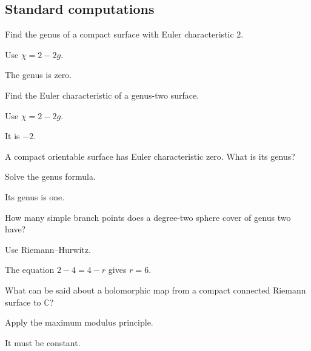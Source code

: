 \subsection*{Standard computations}

\begin{exercise}\label{exr:iv26-expand-01}
Find the genus of a compact surface with Euler characteristic \(2\).
\end{exercise}
\begin{hint}
Use \(\chi=2-2g\).
\end{hint}
\begin{solution}
The genus is zero.
\end{solution}

\begin{exercise}\label{exr:iv26-expand-02}
Find the Euler characteristic of a genus-two surface.
\end{exercise}
\begin{hint}
Use \(\chi=2-2g\).
\end{hint}
\begin{solution}
It is \(-2\).
\end{solution}

\begin{exercise}\label{exr:iv26-expand-03}
A compact orientable surface has Euler characteristic zero. What is its genus?
\end{exercise}
\begin{hint}
Solve the genus formula.
\end{hint}
\begin{solution}
Its genus is one.
\end{solution}

\begin{exercise}\label{exr:iv26-expand-04}
How many simple branch points does a degree-two sphere cover of genus two have?
\end{exercise}
\begin{hint}
Use Riemann--Hurwitz.
\end{hint}
\begin{solution}
The equation \(2-4=4-r\) gives \(r=6\).
\end{solution}

\begin{exercise}\label{exr:iv26-expand-05}
What can be said about a holomorphic map from a compact connected Riemann surface to \(\mathbb C\)?
\end{exercise}
\begin{hint}
Apply the maximum modulus principle.
\end{hint}
\begin{solution}
It must be constant.
\end{solution}

